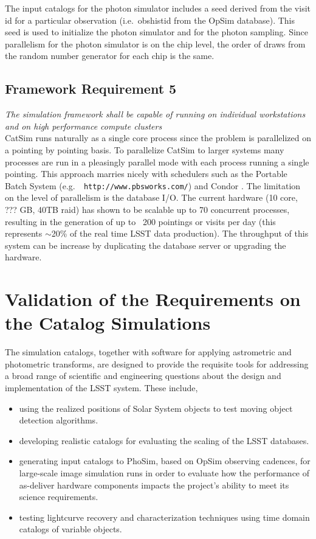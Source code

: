 \documentclass[11pt]{article}
\begin{document}
The input catalogs for the photon simulator includes a seed derived
from the visit id for a particular observation (i.e.\ obshistid from
the OpSim database). This seed is used to initialize the photon
simulator and for the photon sampling. Since parallelism for the
photon simulator is on the chip level, the order of draws from the
random number generator for each chip is the same.


\subsection{Framework Requirement 5}

{\it The simulation framework shall be capable of running on individual workstations 
and on high performance compute clusters}\\


CatSim runs naturally as a single core process since the problem is
parallelized on a pointing by pointing basis.  To parallelize CatSim
to larger systems many processes are run in a pleasingly parallel mode
with each process running a single pointing.  This approach marries
nicely with schedulers such as the Portable Batch System (e.g.\ {\tt
  http://www.pbsworks.com/}) and Condor \citep{condor}.  The
limitation on the level of parallelism is the database I/O.  The
current hardware (10 core, ??? GB, 40TB raid) has shown to be scalable
up to 70 concurrent processes, resulting in the generation of up to
~200 pointings or visits per day (this represents $\sim$20\% of the
real time LSST data production).  The throughput of this system can be
increase by duplicating the database server or upgrading the hardware.

\section{Validation of the Requirements on the Catalog Simulations}

The simulation catalogs, together with software for applying
astrometric and photometric transforms, are designed to provide the
requisite tools for addressing a broad range of scientific and
engineering questions about the design and implementation of the LSST
system. These include,
\begin{itemize}
\item using the realized positions of Solar System objects to
  test moving object detection algorithms.
\item developing realistic  catalogs for evaluating the scaling of the LSST databases.
\item generating input catalogs to PhoSim, based on OpSim observing
  cadences, for large-scale image simulation runs in order to evaluate
  how the performance of as-deliver hardware components impacts the
  project's ability to meet its science requirements.
\item testing lightcurve recovery and characterization techniques
  using time domain catalogs of variable objects.
\end{itemize}
\end{document}
